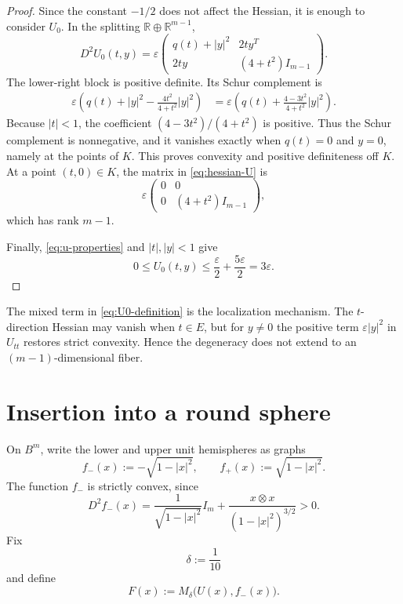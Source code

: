 \documentclass[11pt]{amsart}
\theoremstyle{remark}
\newcommand{\R}{\mathbb R}
\begin{document}
\begin{proof}
Since the constant $-1/2$ does not affect the Hessian, it is enough to consider $U_0$.  In the splitting $\R\oplus\R^{m-1}$,
\begin{equation}\label{eq:hessian-U}
 D^2U_0(t,y)
 =\varepsilon
 \begin{pmatrix}
 q(t)+|y|^2 & 2t y^{T}\\
 2t y & (4+t^2)I_{m-1}
 \end{pmatrix}.
\end{equation}
The lower-right block is positive definite.  Its Schur complement is
\begin{align}
 \varepsilon\left(q(t)+|y|^2
 -\frac{4t^2}{4+t^2}|y|^2\right)
 &=\varepsilon\left(
 q(t)+\frac{4-3t^2}{4+t^2}|y|^2\right).\label{eq:schur}
\end{align}
Because $|t|<1$, the coefficient $(4-3t^2)/(4+t^2)$ is positive.  Thus the Schur complement is nonnegative, and it vanishes exactly when $q(t)=0$ and $y=0$, namely at the points of $K$.  This proves convexity and positive definiteness off $K$.  At a point $(t,0)\in K$, the matrix in \eqref{eq:hessian-U} is
\[
 \varepsilon
 \begin{pmatrix}
 0&0\\0&(4+t^2)I_{m-1}
 \end{pmatrix},
\]
which has rank $m-1$.

Finally, \eqref{eq:u-properties} and $|t|,|y|<1$ give
\[
 0\leq U_0(t,y)
 \leq\frac\varepsilon2+\frac{5\varepsilon}{2}
 =3\varepsilon.
\]
\end{proof}

The mixed term in \eqref{eq:U0-definition} is the localization mechanism.  The $t$-direction Hessian may vanish when $t\in E$, but for $y\neq0$ the positive term $\varepsilon|y|^2$ in $U_{tt}$ restores strict convexity.  Hence the degeneracy does not extend to an $(m-1)$-dimensional fiber.

\section{Insertion into a round sphere}

On $B^m$, write the lower and upper unit hemispheres as graphs
\begin{equation}\label{eq:hemisphere-functions}
 f_-(x):=-\sqrt{1-|x|^2},
 \qquad
 f_+(x):=\sqrt{1-|x|^2}.
\end{equation}
The function $f_-$ is strictly convex, since
\begin{equation}\label{eq:hessian-lower-sphere}
 D^2f_-(x)
 =\frac1{\sqrt{1-|x|^2}}I_m
 +\frac{x\otimes x}{(1-|x|^2)^{3/2}}>0.
\end{equation}
Fix
\[
 \delta:=\frac1{10}
\]
and define
\begin{equation}\label{eq:F-definition}
 F(x):=M_\delta\bigl(U(x),f_-(x)\bigr).
\end{equation}
\end{document}
